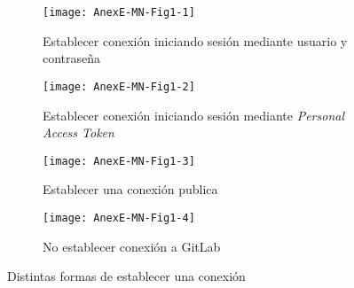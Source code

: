 
\begin{figure}[!h]
	\centering
	\begin{subfigure}{.45\textwidth}
		\centering
		\texttt{[image: AnexE-MN-Fig1-1]}
		\caption{Establecer conexión iniciando sesión mediante usuario y contraseña}
		\label{fig:dialogo-conexion_contraseña}
	\end{subfigure}\hfill
	\begin{subfigure}{.45\textwidth}
		\centering
		\texttt{[image: AnexE-MN-Fig1-2]}
		\caption{Establecer conexión iniciando sesión mediante \textit{Personal Access Token}}
		\label{fig:dialogo-conexion_token}
	\end{subfigure}
	\begin{subfigure}{.45\textwidth}
		\centering
		\texttt{[image: AnexE-MN-Fig1-3]}
		\caption{Establecer una conexión publica}
		\label{fig:dialogo-conexion_publica}
	\end{subfigure}\hfill
	\begin{subfigure}{.45\textwidth}
		\centering
		\texttt{[image: AnexE-MN-Fig1-4]}
		\caption{No establecer conexión a GitLab}
		\label{fig:dialogo-conexion_sin-conexion}
	\end{subfigure}
	\caption{Distintas formas de establecer una conexión}
	\label{fig:AnexE-MN-Fig1}
\end{figure}


